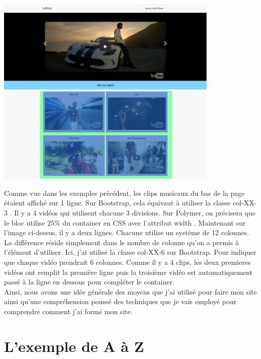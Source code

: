 \documentclass{article}
\begin{document}
\begin{center}
\vspace{0.5cm}
\includegraphics[width=0.8\textwidth]{p13}
\vspace{0.5cm}\\
\end{center}

Comme vue dans les exemples pr\'ec\'edent, les clips musicaux du bas de la page \'etaient affich\'e sur 1 ligne. Sur Bootstrap, cela \'equivaut \`a utiliser la classe \og col-XX-3 \fg{}. Il y a 4 vid\'eos qui utilisent chacune 3 divisions. Sur Polymer, on pr\'ecisera que le bloc utilise 25\% du container en CSS avec l'attribut \og width \fg{}. Maintenant sur l'image ci-dessus, il y a deux lignes. Chacune utilise un syst\`eme de 12 colonnes. La diff\'erence r\'eside simplement dans le nombre de colonne qu'on a permis \`a l'\'el\'ement d'utiliser. Ici, j'ai utilis\'e la classe \og col-XX-6 \fg{} sur Bootstrap. Pour indiquer que chaque vid\'eo prendrait 6 colonnes. Comme il y a 4 clips, les deux premieres vid\'eos ont remplit la premi\`ere ligne puis la troisi\`eme vid\'eo est automatiquement pass\'e \`a la ligne en dessous pour compl\'eter le container.\\

Ainsi, nous avons une id\'ee g\'en\'erale des moyens que j'ai utilis\'e pour faire mon site ainsi qu'une compr\'ehension pouss\'e des techniques que je vais employ\'e pour comprendre comment j'ai form\'e mon site.

\newpage
\section{L'exemple de A \`a Z}
\end{document}
